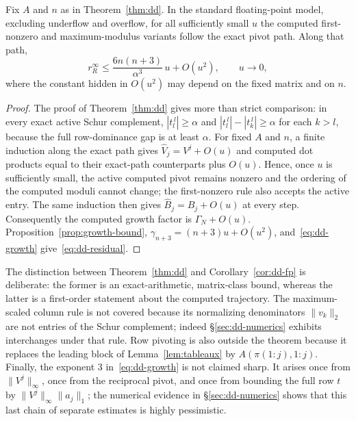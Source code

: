 \documentclass[review,onefignum,onetabnum]{siamart251216}
\begin{document}
\begin{corollary}\label{cor:dd-fp}
Fix $A$ and $n$ as in Theorem~\ref{thm:dd}. In the standard floating-point model, excluding
underflow and overflow, for all sufficiently small $u$ the computed first-nonzero and
maximum-modulus variants follow the exact pivot path. Along that path,
%
\begin{equation}\label{eq:dd-residual}
r_R^{\infty}
\le
\frac{6n(n+3)}{\alpha^3}\,u+O(u^2),
\qquad u\to0,
\end{equation}
%
where the constant hidden in $O(u^2)$ may depend on the fixed matrix and on $n$.
\end{corollary}

\begin{proof}
The proof of Theorem~\ref{thm:dd} gives more than strict comparison: in every exact active Schur
complement,
$|t_l^{\,l}|\ge\alpha$ and
$|t_l^{\,l}|-|t_k^{\,l}|\ge\alpha$ for each $k>l$, because the full row-dominance gap is at least
$\alpha$. For fixed $A$ and $n$, a finite induction along the exact path gives
$\widehat V_j=V^j+O(u)$ and computed dot products equal to their exact-path counterparts plus
$O(u)$. Hence, once $u$ is sufficiently small, the active computed pivot remains nonzero and the
ordering of the computed moduli cannot change; the first-nonzero rule also accepts the active
entry. The same induction then gives $\widehat B_j=B_j+O(u)$ at every step. Consequently the
computed growth factor is $\Gamma_N+O(u)$. Proposition~\ref{prop:growth-bound},
$\gamma_{n+3}=(n+3)u+O(u^2)$, and~\eqref{eq:dd-growth} give~\eqref{eq:dd-residual}.
\end{proof}

\begin{remark}\label{rem:dd-caveats}
The distinction between Theorem~\ref{thm:dd} and Corollary~\ref{cor:dd-fp} is deliberate: the
former is an exact-arithmetic, matrix-class bound, whereas the latter is a first-order statement
about the computed trajectory. The maximum-scaled column rule is not covered because its
normalizing denominators $\|v_k\|_2$ are not entries of the Schur complement; indeed
\S\ref{sec:dd-numerics} exhibits interchanges under that rule. Row pivoting is also outside the
theorem because it replaces the leading block of Lemma~\ref{lem:tableaux} by
$A(\pi(1{:}j),1{:}j)$. Finally, the exponent $3$ in~\eqref{eq:dd-growth} is not claimed sharp. It
arises once from $\|V^j\|_\infty$, once from the reciprocal pivot, and once from bounding the full
row $t$ by $\|V^j\|_\infty\|a_j\|_1$; the numerical evidence in \S\ref{sec:dd-numerics} shows that
this last chain of separate estimates is highly pessimistic.
\end{remark}
\end{document}
